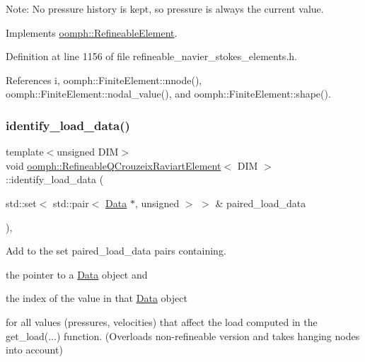 Note\+: No pressure history is kept, so pressure is always the current value. 

Implements \hyperlink{classoomph_1_1RefineableElement_ada6f0efe831ffefb1d2829ce01d45bfc}{oomph\+::\+Refineable\+Element}.



Definition at line 1156 of file refineable\+\_\+navier\+\_\+stokes\+\_\+elements.\+h.



References i, oomph\+::\+Finite\+Element\+::nnode(), oomph\+::\+Finite\+Element\+::nodal\+\_\+value(), and oomph\+::\+Finite\+Element\+::shape().

\mbox{\label{classoomph_1_1RefineableQCrouzeixRaviartElement_ad2389a0bad47e50cb11cb2cea3f57b24}} 
\subsubsection{\texorpdfstring{identify\+\_\+load\+\_\+data()}{identify\_load\_data()}}
{\footnotesize\ttfamily template$<$unsigned D\+IM$>$ \\
void \hyperlink{classoomph_1_1RefineableQCrouzeixRaviartElement}{oomph\+::\+Refineable\+Q\+Crouzeix\+Raviart\+Element}$<$ D\+IM $>$\+::identify\+\_\+load\+\_\+data (\begin{DoxyParamCaption}\item[{std\+::set$<$ std\+::pair$<$ \hyperlink{classoomph_1_1Data}{Data} $\ast$, unsigned $>$ $>$ \&}]{paired\+\_\+load\+\_\+data }\end{DoxyParamCaption})\hspace{0.3cm}{\ttfamily [inline]}, {\ttfamily [virtual]}}



Add to the set {\ttfamily paired\+\_\+load\+\_\+data} pairs containing. 


\begin{DoxyItemize}
\item the pointer to a \hyperlink{classoomph_1_1Data}{Data} object and
\item the index of the value in that \hyperlink{classoomph_1_1Data}{Data} object
\end{DoxyItemize}for all values (pressures, velocities) that affect the load computed in the {\ttfamily get\+\_\+load}(...) function. (Overloads non-\/refineable version and takes hanging nodes into account) 

